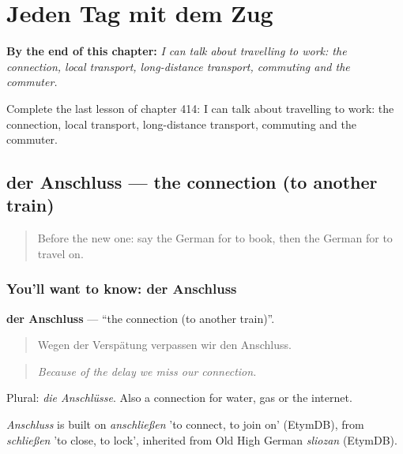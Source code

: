 
\chapter{Jeden Tag mit dem Zug}
\label{ch:ge-jeden-tag-mit-dem-zug}

\begin{chapteropening}
\textbf{By the end of this chapter:} \emph{I can talk about travelling to work: the connection, local transport, long-distance transport, commuting and the commuter.}

Complete the last lesson of chapter 414: I can talk about travelling to work: the connection, local transport, long-distance transport, commuting and the commuter.
\end{chapteropening}

\section[der Anschluss]{der Anschluss — the connection (to another train)}

\label{lesson:GE-C414-anschluss}



\begin{quote}
Before the new one: say the German for to book, then the German for to travel on.
\end{quote}

\subsection*{You'll want to know: der Anschluss}
\textbf{der Anschluss} — \textquotedblleft{}the connection (to another train)\textquotedblright{}.

\begin{quote}
Wegen der Verspätung verpassen wir den Anschluss.
\end{quote}

\begin{quote}
\emph{Because of the delay we miss our connection.}
\end{quote}

Plural: \emph{die Anschlüsse}. Also a connection for water, gas or the internet.

\begin{cousinweb}
\emph{Anschluss} is built on \emph{anschließen} 'to connect, to join on' (EtymDB), from \emph{schließen} 'to close, to lock', inherited from Old High German \emph{sliozan} (EtymDB).
\end{cousinweb}

